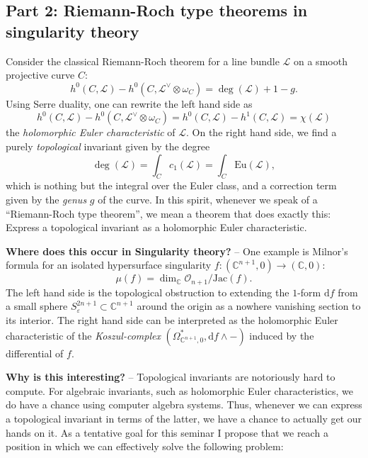 \documentclass[a4paper]{article}
\newcommand{\D}{\mathrm{d}}
\begin{document}
\subsection{Part 2: Riemann-Roch type theorems in singularity theory}
Consider the classical Riemann-Roch theorem for a line bundle $\mathcal L$ 
on a smooth projective curve $C$:
\begin{equation}
  h^0(C, \mathcal L) - h^0(C, \mathcal L^\vee \otimes \omega_C) 
  = 
  \deg(\mathcal L) + 1 - g.
  \label{eqn:RRforCurves}
\end{equation}
Using Serre duality, one can rewrite the left hand side as 
\[
  h^0(C, \mathcal L) - h^0(C, \mathcal L^\vee \otimes \omega_C) 
  = h^0(C, \mathcal L) - h^1(C, \mathcal L) = \chi(\mathcal L)
\]
the \textit{holomorphic Euler characteristic} of $\mathcal L$. 
On the right hand side, we find a purely \textit{topological}
invariant given by the degree
\[
  \deg(\mathcal L) = \int_C c_1(\mathcal L) = \int_C \mathrm{Eu}(\mathcal L),
\]
which is nothing but the integral over the Euler class, and 
a correction term given by the \textit{genus} $g$ of the curve. 
In this spirit, whenever we speak of a ``Riemann-Roch type theorem'', 
we mean a theorem that does exactly this: Express a topological 
invariant as a holomorphic Euler characteristic. 

\medskip

\textbf{Where does this occur in Singularity theory?} -- 
One example is Milnor's formula for an isolated hypersurface singularity
$f\colon (\mathbb C^{n+1}, 0) \to (\mathbb C, 0)$: 
\[
  \mu(f) = \dim_\mathbb C \mathcal O_{n+1}/\mathrm{Jac}(f).
\]
The left hand side is the topological obstruction to extending the 
$1$-form $\D f$ from a small sphere $S_\varepsilon^{2n+1}\subset \mathbb C^{n+1}$
around the origin as a nowhere vanishing section to its interior. 
The right hand side can be interpreted as the holomorphic Euler characteristic 
of the \textit{Koszul-complex} $(\Omega^*_{\mathbb C^{n+1}, 0}, \D f \wedge - )$ 
induced by the differential of $f$. 

\medskip

\textbf{Why is this interesting?} -- Topological invariants are notoriously 
hard to compute. For algebraic invariants, such as holomorphic Euler characteristics, 
we do have a chance using computer algebra systems. Thus, whenever we can express 
a topological invariant in terms of the latter, we have a chance to actually get 
our hands on it. As a tentative goal for this seminar I propose that we reach a 
position in which we can effectively solve the following problem:
\end{document}

